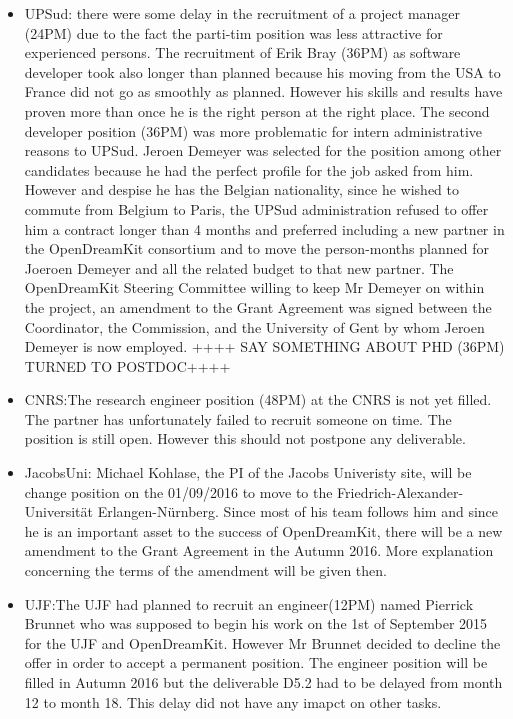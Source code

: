 \documentclass{../../Proposal/LaTeX-proposal/deliverablereport}
\begin{document}
\begin{itemize}
\item{UPSud:} there were some delay in the recruitment of a project manager (24PM) due to the fact the parti-tim position was less attractive for experienced persons. The recruitment of Erik Bray (36PM) as software developer took also longer than planned because his moving from the USA to France did not go as smoothly as planned. However his skills and results have proven more than once he is the right person at the right place.
The second developer position (36PM) was more problematic for intern administrative reasons to UPSud. Jeroen Demeyer was selected  for the position among other candidates because he had the perfect profile for the job asked from him. However and despise he has the Belgian nationality, since he wished to commute from Belgium to Paris, the UPSud administration refused to offer him a contract longer than 4 months and preferred including a new partner in the OpenDreamKit consortium  and to move the person-months planned for Joeroen Demeyer and all the related budget to that new partner. The OpenDreamKit Steering Committee willing to keep Mr Demeyer on within the project, an amendment to the Grant Agreement was signed between the Coordinator, the Commission, and the University of Gent by whom Jeroen Demeyer is now employed. ++++ SAY SOMETHING ABOUT PHD (36PM) TURNED TO POSTDOC++++

\item{CNRS:}The research engineer position (48PM) at the CNRS is not yet filled. The partner has unfortunately failed to recruit someone on time. The position is still open. However this should not postpone any deliverable.

\item{JacobsUni:} Michael Kohlase, the PI of the Jacobs Univeristy site, will be change position on the 01/09/2016 to move to the Friedrich-Alexander-Universität Erlangen-Nürnberg. Since most of his team follows him and since he is an important asset to the success of OpenDreamKit, there will be a new amendment to the Grant Agreement in the Autumn 2016. More explanation concerning the terms of the amendment will be given then.

\item{UJF:}The UJF had planned to recruit an engineer(12PM) named Pierrick Brunnet who was supposed to begin his work on the 1st of September 2015 for the UJF and OpenDreamKit. However Mr Brunnet decided to decline the offer in order to accept a permanent position. The engineer position will be filled in Autumn 2016 but the deliverable D5.2 had to be delayed from month 12 to month 18. This delay did not have any imapct on other tasks.


\end{itemize}
\end{document}
